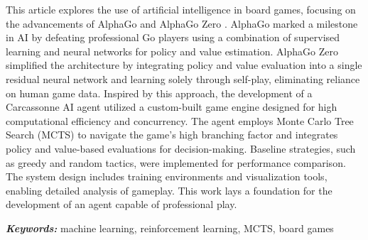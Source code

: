 This article explores the use of artificial intelligence in board games, focusing
on the advancements of AlphaGo \cite{AlphaGoAlgorithm} and AlphaGo Zero \cite{AlphaGoZero}. 
AlphaGo marked a milestone in AI by defeating professional Go players using a 
combination of supervised learning and neural networks for policy and value estimation. 
AlphaGo Zero simplified the architecture by integrating policy and value evaluation 
into a single residual neural network and learning solely through self-play, 
eliminating reliance on human game data. Inspired by this approach, the development 
of a Carcassonne AI agent utilized a custom-built game engine designed for 
high computational efficiency and concurrency. The agent employs Monte Carlo Tree Search (MCTS) 
to navigate the game’s high branching factor and integrates policy and value-based 
evaluations for decision-making. Baseline strategies, such as greedy and random tactics, 
were implemented for performance comparison. The system design includes training 
environments and visualization tools, enabling detailed analysis of gameplay. 
This work lays a foundation for the development of an agent capable of professional play.

\small
\textbf{\textit{Keywords:}} machine learning, reinforcement learning, MCTS, board games
